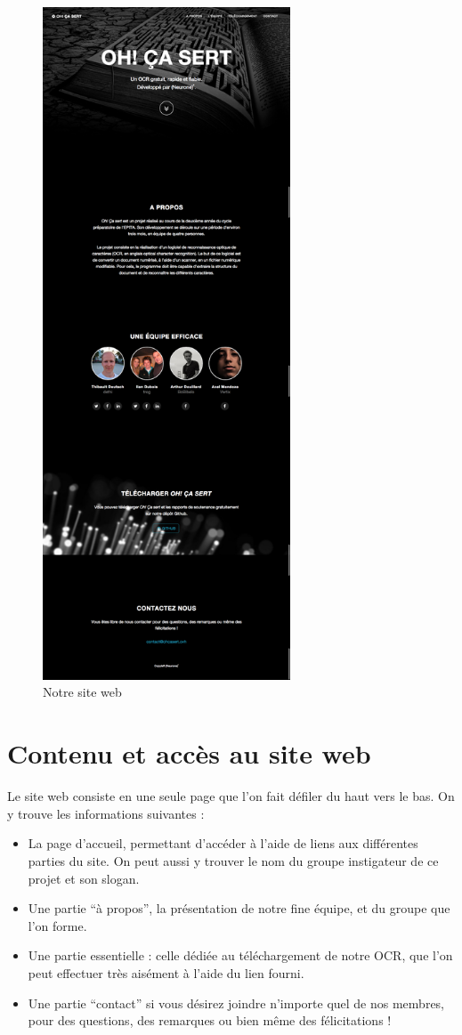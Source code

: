 \documentclass[11pt]{report}
\begin{document}
\begin{figure}[htbp]
\centering
\includegraphics[height=20cm]{www.png}
\caption{Notre site web}
\end{figure}

\section{Contenu et accès au site web}

Le site web consiste en une seule page que l'on fait défiler du haut vers le bas. On y trouve les informations suivantes :

\begin{itemize}
\item La page d’accueil, permettant d'accéder à l'aide de liens aux différentes parties du site. On peut aussi y trouver le nom du groupe instigateur de ce projet et son slogan.
\item Une partie ``à propos'',  la présentation de notre fine équipe, et du groupe que l'on forme.
\item Une partie essentielle : celle dédiée au téléchargement de notre OCR, que l'on peut effectuer très aisément à l'aide du lien fourni.
\item Une partie ``contact'' si vous désirez joindre n'importe quel de nos membres, pour des questions, des remarques ou bien même des félicitations !
\end{itemize}
\end{document}
